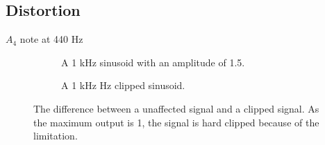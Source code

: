 \subsection{Distortion}

$A_4$ note at 440 Hz

\begin{figure}[H]
\centering
\begin{subfigure}[t]{0.47\textwidth}
	
	\caption{A 1 kHz sinusoid with an amplitude of 1.5.}
	\label{fig:EvenTHD}
\end{subfigure}
\hspace{6mm} 
\begin{subfigure}[t]{0.47\textwidth}
	
	\caption{A 1 kHz Hz clipped sinusoid.}
	\label{fig:OddTHD}
\end{subfigure}
\caption{The difference between a unaffected signal and a clipped signal. As the maximum output is 1, the signal is hard clipped because of the limitation.}
\end{figure}


